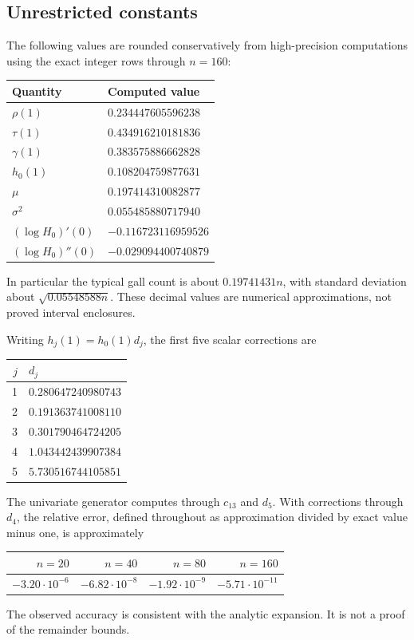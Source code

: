 \documentclass[11pt,letterpaper]{article}
\numberwithin{equation}{section}
\theoremstyle{definition}\newtheorem{definition}[theorem]{Definition}
\theoremstyle{remark}\newtheorem{remark}[theorem]{Remark}
\begin{document}
\subsection{Unrestricted constants}
The following values are rounded conservatively from high-precision computations using the exact integer rows through $n=160$:
\begin{center}
\begin{tabular}{@{}ll@{}}
\toprule
Quantity & Computed value\\
\midrule
$\rho(1)$ & $0.234447605596238$\\
$\tau(1)$ & $0.434916210181836$\\
$\gamma(1)$ & $0.383575886662828$\\
$h_0(1)$ & $0.108204759877631$\\
$\mu$ & $0.197414310082877$\\
$\sigma^2$ & $0.055485880717940$\\
$(\log H_0)'(0)$ & $-0.116723116959526$\\
$(\log H_0)''(0)$ & $-0.029094400740879$\\
\bottomrule
\end{tabular}
\end{center}
In particular the typical gall count is about $0.19741431n$, with standard deviation about $\sqrt{0.05548588n}$. These decimal values are numerical approximations, not proved interval enclosures.

Writing $h_j(1)=h_0(1)d_j$, the first five scalar corrections are
\begin{center}
\begin{tabular}{@{}rl@{}}
\toprule
$j$ & $d_j$\\\midrule
1 & $0.280647240980743$\\
2 & $0.191363741008110$\\
3 & $0.301790464724205$\\
4 & $1.043442439907384$\\
5 & $5.730516744105851$\\
\bottomrule
\end{tabular}
\end{center}
The univariate generator computes through $c_{13}$ and $d_5$. With corrections through $d_4$, the relative error, defined throughout as approximation divided by exact value minus one, is approximately
\begin{center}
\begin{tabular}{@{}rrrr@{}}
\toprule
$n=20$ & $n=40$ & $n=80$ & $n=160$\\\midrule
$-3.20\cdot10^{-6}$ & $-6.82\cdot10^{-8}$ & $-1.92\cdot10^{-9}$ & $-5.71\cdot10^{-11}$\\
\bottomrule
\end{tabular}
\end{center}
The observed accuracy is consistent with the analytic expansion. It is not a proof of the remainder bounds.
\end{document}
